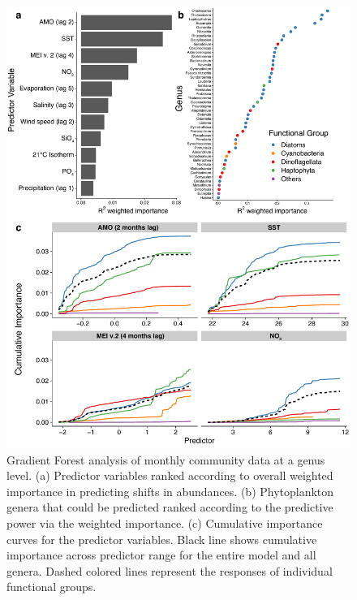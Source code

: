 \documentclass[draft]{agujournal2019}
\begin{document}
\begin{figure}
\noindent\includegraphics[width=\textwidth]{fig/Figure6_GF_output_FINAL_v2.pdf}
\caption{Gradient Forest analysis of monthly community data at a genus level. (a) Predictor variables ranked according to overall weighted importance in predicting shifts in abundances. (b) Phytoplankton genera that could be predicted ranked according to the predictive power via the weighted importance. (c) Cumulative importance curves for the predictor variables. Black line shows cumulative importance across predictor range for the entire model and all genera. Dashed colored lines represent the responses of individual functional groups.}
\label{fig:GF}
\end{figure}
\end{document}
